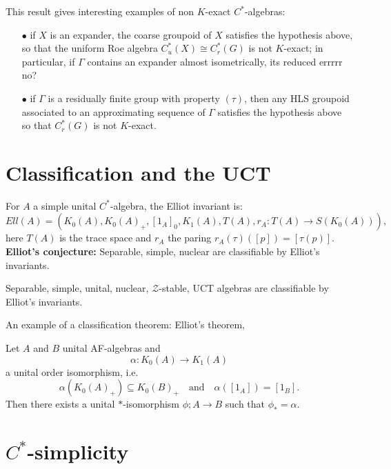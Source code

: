 This result gives interesting examples of non $K$-exact $C^*$-algebras:
\begin{itemize}
\item[$\bullet$] if $X$ is an expander, the coarse groupoid of $X$ satisfies the hypothesis above, so that the uniform Roe algebra $C^*_u(X)\cong C_r^*(G)$ is not $K$-exact; in particular, if $\Gamma$ contains an expander almost isometrically, its reduced errrrr no?   
\item[$\bullet$] if $\Gamma$ is a residually finite group with property $(\tau)$, then any HLS groupoid associated to an approximating sequence of $\Gamma$ satisfies the hypothesis above so that $C_r^*(G)$ is not $K$-exact.
\end{itemize} 

\section{Classification and the UCT}

For $A$ a simple unital $C^*$-algebra, the Elliot invariant is:
\[Ell(A) = \left( K_0(A), K_0(A)_+ , [1_A]_0 , K_1(A), T(A) , r_A : T(A) \rightarrow S(K_0(A)) \right) ,\]
here $T(A)$ is the trace space and $r_A$ the paring $r_A(\tau)([p]) = [\tau(p)]$.\\

\textbf{Elliot's conjecture:} Separable, simple, nuclear are classifiable by Elliot's invariants.

\begin{thm}
Separable, simple, unital, nuclear, $\mathcal Z$-stable, UCT algebras are classifiable by Elliot's invariants.
\end{thm}

An example of a classification theorem: Elliot's theorem,

\begin{thm}
Let $A$ and $B$ unital AF-algebras and \[\alpha : K_0(A) \rightarrow K_1(A)\]
a unital order isomorphism, i.e. \[\alpha(K_0(A)_+) \subseteq K_0(B)_+ \quad \text{and} \quad \alpha([1_A])=[1_B].\]
Then there exists a unital $*$-isomorphism $\phi; A\rightarrow B$ such that $\phi_*=\alpha$.
\end{thm}

\newpage
\section{$C^*$-simplicity}

